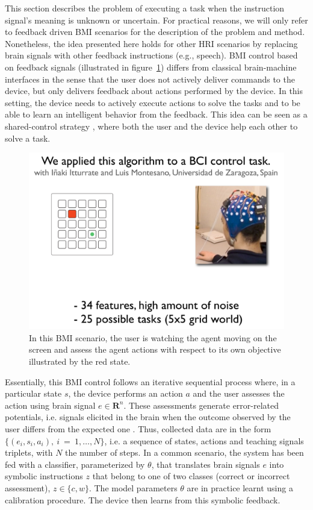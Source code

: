 \documentclass[conference]{IEEEtran}
\begin{document}
This section describes the problem of executing a task when the instruction signal's meaning is unknown or uncertain. For practical reasons, we will only refer to feedback driven BMI scenarios for the description of the problem and method. Nonetheless, the idea presented here holds for other HRI scenarios by replacing brain signals with other feedback instructions (e.g., speech). BMI control based on feedback signals (illustrated in figure~\ref{fig:grid}) differs from classical brain-machine interfaces in the sense that the user does not actively deliver commands to the device, but only delivers feedback about actions performed by the device. In this setting, the device needs to actively execute actions to solve the tasks and to be able to learn an intelligent behavior from the feedback. This idea can be seen as a shared-control strategy \cite{Iturrate13ErrPControl}, where both the user and the device help each other to solve a task.

\begin{figure}[!h]%
\centering
\includegraphics[width=1\columnwidth, trim=3cm 12cm 3cm 6cm, clip=true]{images/BCI.png}
\caption{In this BMI scenario, the user is watching the agent moving on the screen and assess the agent actions with respect to its own objective illustrated by the red state.}
\label{fig:grid}
\end{figure}


Essentially, this BMI control follows an iterative sequential process where, in a particular state $s$, the device performs an action $a$ and the user assesses the action using brain signal $e\in\mathbf{R}^n$. These assessments generate error-related potentials, i.e. signals elicited in the brain when the outcome observed by the user differs from the expected one \cite{FerrezErrores}. Thus, collected data are in the form $\{(e_i,s_i,a_i),~i~=~1,\ldots,N\}$, i.e. a sequence of states, actions and teaching signals triplets, with $N$ the number of steps. 
%
In a common scenario, the system has been fed with a classifier, parameterized by $\theta$, that translates brain signals $e$ into symbolic instructions $z$ that belong to one of two classes (correct or incorrect assessment), $z\in\{c,w\}$. The model parameters $\theta$ are in practice learnt using a calibration procedure. The device then learns from this symbolic feedback. 
\end{document}
